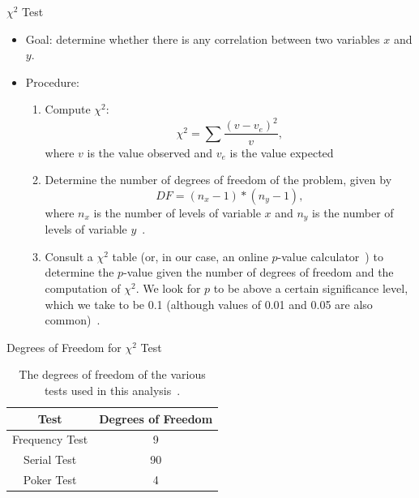 \documentclass{beamer} %
\begin{document}
\begin{frame}{$\chi^{2}$ Test}
\begin{itemize}
\item Goal: determine whether there is any correlation between two variables $x$ and $y$.  
\item Procedure:
\begin{enumerate}
\item Compute $\chi^{2}$:
\begin{equation}
\label{eq:chi2}
\chi^{2}=\sum\frac{\left(v-v_{e}\right)^{2}}{v},
\end{equation}
where $v$ is the value observed and $v_{e}$ is the value expected~\cite{babington}  
\item Determine the number of degrees of freedom of the problem, given by 
\begin{equation}
\label{eq:degfree}
DF = (n_{x}-1)*(n_{y}-1),
\end{equation}
where $n_{x}$ is the number of levels of variable $x$ and $n_{y}$ is the number of levels of variable $y$~\cite{chi}. 
\item Consult a $\chi^{2}$ table (or, in our case, an online $p$-value calculator~\cite{graphpad}) to determine the $p$-value given the number of degrees of freedom and the computation of $\chi^{2}$.  We look for $p$ to be above a certain significance level, which we take to be 0.1 (although values of 0.01 and 0.05 are also common)~\cite{drueke}.
\end{enumerate}
\end{itemize}
\end{frame}

\begin{frame}{Degrees of Freedom for $\chi^{2}$ Test}
\begin{table}[ht]
\begin{center}
\begin{tabular}{c|c} \hline
	Test & Degrees of Freedom \\ \hline
     Frequency Test & 9 \\
     Serial Test & 90 \\
     Poker Test & 4 \\ \hline
\end{tabular}
\caption{The degrees of freedom of the various tests used in this analysis~\cite{babington}.}
\label{tab:degfree}
\end{center}
\end{table}
\end{frame}
\end{document}
